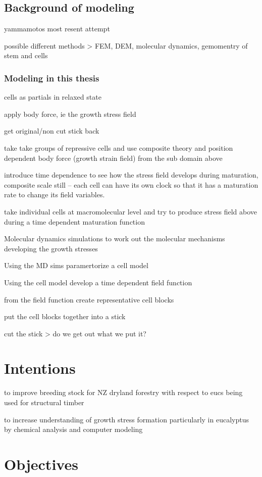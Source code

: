 \documentclass{article}
\begin{document}
\subsection{Background of modeling}

yammamotos most resent attempt

possible different methods > FEM, DEM, molecular dynamics, gemomentry of stem
and cells

\subsubsection{Modeling in this thesis}
cells as partials in relaxed state

apply body force, ie the growth stress field

get original/non cut stick back

take take groups of repressive cells and use composite theory and position dependent body force
(growth strain field) from the sub domain above

introduce time dependence to see how the stress field develops during
maturation, composite scale still -- each cell can have its own clock so that it
has a maturation rate to change its field variables.

take individual cells at macromolecular level and try to produce stress field
above during a time dependent maturation function

Molecular dynamics simulations to work out the molecular mechanisms developing the growth stresses

Using the MD sims paramertorize a cell model

Using the cell model develop a time dependent field function

from the field function create representative cell blocks

put the cell blocks together into a stick

cut the stick > do we get out what we put it?

\section{Intentions}
to improve breeding stock for NZ dryland forestry with respect to eucs being used for structural timber

to increase understanding of growth stress formation particularly in eucalyptus
by chemical analysis and computer modeling

\section{Objectives}
\end{document}
